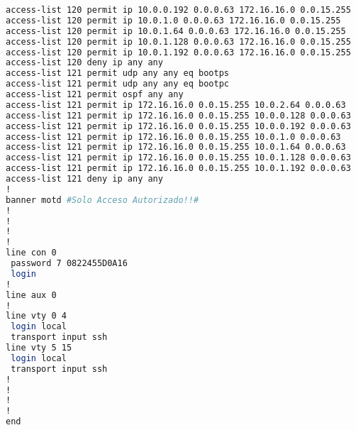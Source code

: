 \begin{lstlisting}[language=Bash, caption={Configuración Completa Switch IoMT Planta 1}]
access-list 120 permit ip 10.0.0.192 0.0.0.63 172.16.16.0 0.0.15.255
access-list 120 permit ip 10.0.1.0 0.0.0.63 172.16.16.0 0.0.15.255
access-list 120 permit ip 10.0.1.64 0.0.0.63 172.16.16.0 0.0.15.255
access-list 120 permit ip 10.0.1.128 0.0.0.63 172.16.16.0 0.0.15.255
access-list 120 permit ip 10.0.1.192 0.0.0.63 172.16.16.0 0.0.15.255
access-list 120 deny ip any any
access-list 121 permit udp any any eq bootps
access-list 121 permit udp any any eq bootpc
access-list 121 permit ospf any any
access-list 121 permit ip 172.16.16.0 0.0.15.255 10.0.2.64 0.0.0.63
access-list 121 permit ip 172.16.16.0 0.0.15.255 10.0.0.128 0.0.0.63
access-list 121 permit ip 172.16.16.0 0.0.15.255 10.0.0.192 0.0.0.63
access-list 121 permit ip 172.16.16.0 0.0.15.255 10.0.1.0 0.0.0.63
access-list 121 permit ip 172.16.16.0 0.0.15.255 10.0.1.64 0.0.0.63
access-list 121 permit ip 172.16.16.0 0.0.15.255 10.0.1.128 0.0.0.63
access-list 121 permit ip 172.16.16.0 0.0.15.255 10.0.1.192 0.0.0.63
access-list 121 deny ip any any
!
banner motd #Solo Acceso Autorizado!!#
!
!
!
!
line con 0
 password 7 0822455D0A16
 login
!
line aux 0
!
line vty 0 4
 login local
 transport input ssh
line vty 5 15
 login local
 transport input ssh
!
!
!
!
end


\end{lstlisting}
